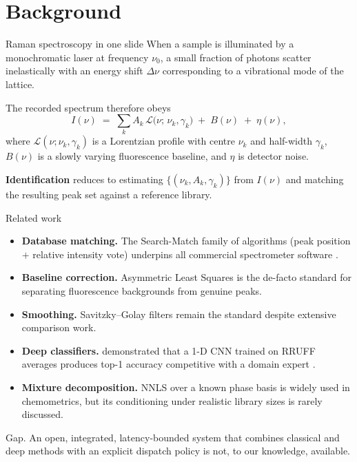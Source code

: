 \documentclass[10pt,aspectratio=169,xcolor=dvipsnames]{beamer}
\begin{document}
\section{Background}

\begin{frame}{Raman spectroscopy in one slide}
  When a sample is illuminated by a monochromatic laser at frequency
  $\nu_{0}$, a small fraction of photons scatter inelastically with an
  energy shift $\Delta\nu$ corresponding to a vibrational mode of the lattice.
  \medskip

  The recorded spectrum therefore obeys
  \[
    I(\nu) \;=\; \sum_{k} A_{k}\,\mathcal{L}\!\bigl(\nu;\,\nu_{k},\gamma_{k}\bigr) \;+\; B(\nu) \;+\; \eta(\nu),
  \]
  where $\mathcal{L}(\nu; \nu_{k}, \gamma_{k})$ is a Lorentzian profile with
  centre $\nu_{k}$ and half-width $\gamma_{k}$, $B(\nu)$ is a slowly varying
  fluorescence baseline, and $\eta$ is detector noise.
  \medskip

  \textbf{Identification} reduces to estimating $\{(\nu_k, A_k, \gamma_k)\}$
  from $I(\nu)$ and matching the resulting peak set against a reference library.
\end{frame}

\begin{frame}{Related work}
  \begin{itemize}\setlength\itemsep{0.45em}
    \item \textbf{Database matching.} The Search-Match family of algorithms
          (peak position $+$ relative intensity vote) underpins all
          commercial spectrometer software \cite{lafuente2015rruff}.
    \item \textbf{Baseline correction.} Asymmetric Least Squares
          \cite{eilers2005baseline} is the de-facto standard for separating
          fluorescence backgrounds from genuine peaks.
    \item \textbf{Smoothing.} Savitzky–Golay filters \cite{savitzky1964smoothing}
          remain the standard despite extensive comparison work.
    \item \textbf{Deep classifiers.} \citeauthor{liu2017deep} demonstrated that
          a 1-D CNN trained on RRUFF averages produces top-1 accuracy
          competitive with a domain expert \cite{liu2017deep}.
    \item \textbf{Mixture decomposition.} NNLS over a known phase basis
          \cite{lawson1995nnls} is widely used in chemometrics, but its
          conditioning under realistic library sizes is rarely discussed.
  \end{itemize}
  \medskip
  \alert{Gap.} An open, integrated, latency-bounded system that combines
  classical and deep methods with an explicit dispatch policy is not, to our
  knowledge, available.
\end{frame}
\end{document}
